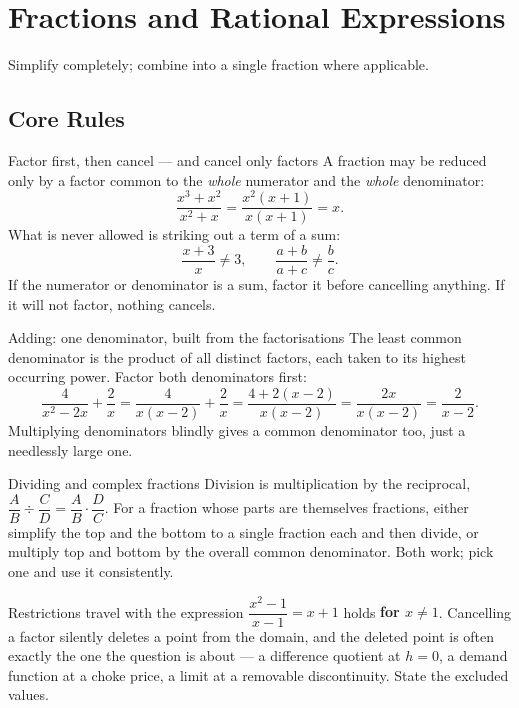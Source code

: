\chapter{Fractions and Rational Expressions}

Simplify completely; combine into a single fraction where applicable.

\section{Core Rules}

\begin{rulebox}{Factor first, then cancel --- and cancel only factors}
A fraction may be reduced only by a factor common to the \emph{whole}
numerator and the \emph{whole} denominator:
\[
  \frac{x^{3}+x^{2}}{x^{2}+x}=\frac{x^{2}(x+1)}{x(x+1)}=x .
\]
What is never allowed is striking out a term of a sum:
\[
  \frac{x+3}{x}\neq 3,\qquad
  \frac{a+b}{a+c}\neq\frac{b}{c} .
\]
If the numerator or denominator is a sum, factor it before cancelling
anything. If it will not factor, nothing cancels.
\end{rulebox}

\begin{rulebox}{Adding: one denominator, built from the factorisations}
The least common denominator is the product of all distinct factors, each
taken to its highest occurring power. Factor both denominators first:
\[
  \frac{4}{x^{2}-2x}+\frac{2}{x}
  =\frac{4}{x(x-2)}+\frac{2}{x}
  =\frac{4+2(x-2)}{x(x-2)}
  =\frac{2x}{x(x-2)}
  =\frac{2}{x-2}.
\]
Multiplying denominators blindly gives a common denominator too, just a
needlessly large one.
\end{rulebox}

\begin{rulebox}{Dividing and complex fractions}
Division is multiplication by the reciprocal,
$\dfrac{A}{B}\div\dfrac{C}{D}=\dfrac{A}{B}\cdot\dfrac{D}{C}$. For a fraction
whose parts are themselves fractions, either simplify the top and the bottom
to a single fraction each and then divide, or multiply top and bottom by the
overall common denominator. Both work; pick one and use it consistently.
\end{rulebox}

\begin{rulebox}{Restrictions travel with the expression}
$\dfrac{x^{2}-1}{x-1}=x+1$ holds \textbf{for $x\neq1$}. Cancelling a factor
silently deletes a point from the domain, and the deleted point is often
exactly the one the question is about --- a difference quotient at $h=0$, a
demand function at a choke price, a limit at a removable discontinuity.
State the excluded values.
\end{rulebox}

